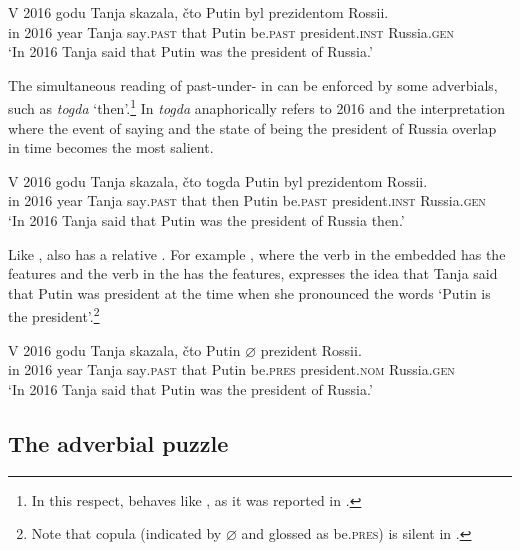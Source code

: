 \documentclass[output=paper,modfonts,newtxmath,hidelinks]{langscibook}
\begin{document}
\ea \label{20:ex1}
\gll V 2016 godu Tanja skazala, čto Putin byl prezidentom Rossii.\\
     in 2016 year Tanja say\textsc{.past} that Putin be\textsc{.past} president\textsc{.inst} Russia\textsc{.gen}\\
\glt `In 2016 Tanja said that Putin was the president of Russia.'
\z

\noindent The simultaneous reading of past-under- in  can be enforced by some adverbials, such as \textit{togda} ‘then’.\footnote{\label{20:fn3}In this respect,  behaves like , as it was reported in \citet{OgiharaSharvit2012}.} In  \textit{togda} anaphorically refers to 2016 and the interpretation where the event of saying and the state of being the president of Russia overlap in time becomes the most salient.

\ea \label{20:ex2}
\gll V 2016 godu Tanja skazala, čto togda Putin byl prezidentom Rossii.\\
     in 2016 year Tanja say\textsc{.past} that then Putin be\textsc{.past} president\textsc{.inst} Russia\textsc{.gen}\\
\glt `In 2016 Tanja said that Putin was the president of Russia then.'
\z

\noindent Like  \citep{OgiharaSharvit2012},  also has a relative . For example , where the verb in the embedded  has the  features and the verb in the  has the  features, expresses the idea that Tanja said that Putin was president at the time when she pronounced the words ‘Putin is the president’.\footnote{\label{20:fn4}Note that  copula (indicated by $\varnothing$ and glossed as be.\textsc{pres}) is silent in .}

\ea \label{20:ex3}
\gll V 2016 godu Tanja skazala, čto Putin ${\varnothing}$ prezident Rossii.\\
     in 2016 year Tanja say\textsc{.past} that Putin be\textsc{.pres} president\textsc{.nom} Russia\textsc{.gen}\\
\glt `In 2016 Tanja said that Putin was the president of Russia.'
\z

\subsection{The adverbial puzzle}\label{20:s1.2}
\end{document}
